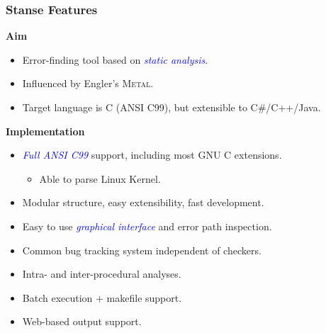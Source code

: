 \documentclass[xcolor=dvipsnames]{beamer}
\let\Oldemph\emph
\renewcommand{\emph}[1]{\textcolor{blue}{\Oldemph{#1}}}
\newcommand{\heading}[1]{\textbf{\textcolor{BurntOrange}{#1}}}
\begin{document}
\begin{frame}
  \frametitle{Stanse Features}
  \heading{Aim}
  \begin{itemize}
  \item Error-finding tool based on \emph{static analysis}.
  \item Influenced by Engler's \textsc{Metal}.
  \item Target language is C (ANSI C99), but extensible to C\#/C++/Java.
  \end{itemize}

  \pause
  \medskip

  \heading{Implementation}
  \begin{itemize}
  \item \emph{Full ANSI C99} support, including most GNU C extensions.
    \begin{itemize}
    \item Able to parse Linux Kernel.
    \end{itemize}
  \item Modular structure, easy extensibility, fast development.
  \item Easy to use \emph{graphical interface} and error path inspection.
  \item Common bug tracking system independent of checkers.
  \item Intra- and inter-procedural analyses.
  \item Batch execution + makefile support.
  \item Web-based output support.
  \end{itemize}
\end{frame}
\end{document}
